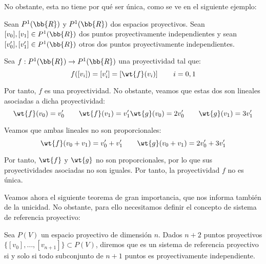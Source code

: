 No obstante, esta no tiene por qué ser única, como se ve en el siguiente ejemplo:
\begin{ejemplo}
    Sean $P^1(\bb{R})$ y $P^1(\bb{R})$ dos espacios proyectivos. Sean $[v_0], [v_1] \in P^1(\bb{R})$ dos puntos proyectivamente independientes
    y sean $[v_0'], [v_1'] \in P^1(\bb{R})$ otros dos puntos proyectivamente independientes.

    Sea $f:P^1(\bb{R})\to P^1(\bb{R})$ una proyectividad tal que:
    \begin{equation*}
        f([v_i]) = [v_i'] = \left[\wt{f}(v_i)\right] \qquad i=0,1
    \end{equation*}

    Por tanto, $f$ es una proyectividad. No obstante, veamos que estas dos son
    lineales asociadas a dicha proyectividad:
    \begin{equation*}
        \wt{f}(v_0) = v_0' \qquad \wt{f}(v_1) = v_1' \\
        \wt{g}(v_0) = 2v_0' \qquad \wt{g}(v_1) = 3v_1'
    \end{equation*}

    Veamos que ambas lineales no son proporcionales:
    \begin{equation*}
        \wt{f}(v_0+v_1) = v_0' + v_1' \qquad \wt{g}(v_0+v_1) = 2v_0' + 3v_1'
    \end{equation*}

    Por tanto, $\wt{f}$ y $\wt{g}$ no son proporcionales, por lo que sus proyectividades asociadas no son iguales.
    Por tanto, la proyectividad $f$ no es única.
\end{ejemplo}

Veamos ahora el siguiente teorema de gran importancia, que nos informa también de la unicidad.
No obstante, para ello necesitamos definir el concepto de sistema de referencia proyectivo:
\begin{definicion}
    Sea $P(V)$ un espacio proyectivo de dimensión $n$. Dados $n+2$ puntos proyectivos $\{[v_0], \dots, [v_{n+1}]\}\subset P(V)$,
    diremos que es un sistema de referencia proyectivo si y solo si
    todo subconjunto de $n+1$ puntos es proyectivamente independiente.
\end{definicion}


